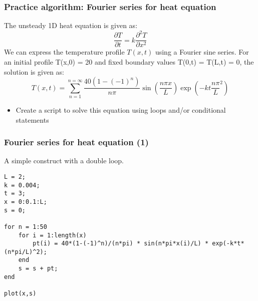 
\begin{frame}[fragile]
 \frametitle{Practice algorithm: Fourier series for heat equation}
 The unsteady 1D heat equation is given as:
 \[
    \frac{\partial T}{\partial t} = k\frac{\partial^2 T}{\partial x^2}
 \]
We can express the temperature profile $T(x,t)$ using a Fourier sine series. For an initial profile T(x,0) = 20 and fixed boundary values T(0,t) = T(L,t) = 0, the solution is given as:
 \[
    T(x,t) = \sum_{n=1}^{n=\infty}\frac{40(1-(-1)^n)}{n\pi}  \sin\left(\frac{n\pi x}{L}\right) \exp\left(-kt\frac{n \pi}{L}^2\right)
 \]
 \begin{itemize}
     \item Create a script to solve this equation using loops and/or conditional statements
 \end{itemize}
\end{frame}

\begin{frame}[fragile]
 \frametitle{Fourier series for heat equation (1)}
 A simple construct with a double loop.
  \begin{lstlisting}
L = 2;
k = 0.004;
t = 3;
x = 0:0.1:L;
s = 0;

for n = 1:50
    for i = 1:length(x)
        pt(i) = 40*(1-(-1)^n)/(n*pi) * sin(n*pi*x(i)/L) * exp(-k*t*(n*pi/L)^2);
    end
    s = s + pt;
end

plot(x,s)
  \end{lstlisting}
\end{frame}

